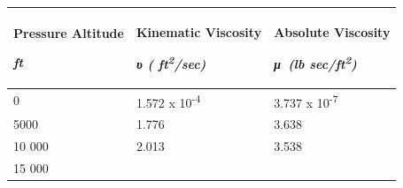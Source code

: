 \documentclass[
]{book}
\begin{document}
\begin{longtable}[]{@{}lll@{}}
\toprule
\begin{minipage}[b]{0.25\columnwidth}\raggedright
Pressure Altitude

\emph{ft}\strut
\end{minipage} & \begin{minipage}[b]{0.28\columnwidth}\raggedright
Kinematic Viscosity

\emph{υ (} \emph{ft\textsuperscript{2}/sec)}\strut
\end{minipage} & \begin{minipage}[b]{0.28\columnwidth}\raggedright
Absolute Viscosity

\emph{μ~(lb sec/ft\textsuperscript{2})}\strut
\end{minipage}\tabularnewline
\midrule
\endhead
\begin{minipage}[t]{0.25\columnwidth}\raggedright
0\strut
\end{minipage} & \begin{minipage}[t]{0.28\columnwidth}\raggedright
1.572 x 10\textsuperscript{-4}\strut
\end{minipage} & \begin{minipage}[t]{0.28\columnwidth}\raggedright
3.737 x 10\textsuperscript{-7}\strut
\end{minipage}\tabularnewline
\begin{minipage}[t]{0.25\columnwidth}\raggedright
5000\strut
\end{minipage} & \begin{minipage}[t]{0.28\columnwidth}\raggedright
1.776\strut
\end{minipage} & \begin{minipage}[t]{0.28\columnwidth}\raggedright
3.638\strut
\end{minipage}\tabularnewline
\begin{minipage}[t]{0.25\columnwidth}\raggedright
10 000\strut
\end{minipage} & \begin{minipage}[t]{0.28\columnwidth}\raggedright
2.013\strut
\end{minipage} & \begin{minipage}[t]{0.28\columnwidth}\raggedright
3.538\strut
\end{minipage}\tabularnewline
\begin{minipage}[t]{0.25\columnwidth}\raggedright
15 000\strut
\end{minipage} & \begin{minipage}[t]{0.28\columnwidth}\raggedright

\end{minipage}
\end{longtable}
\end{document}

